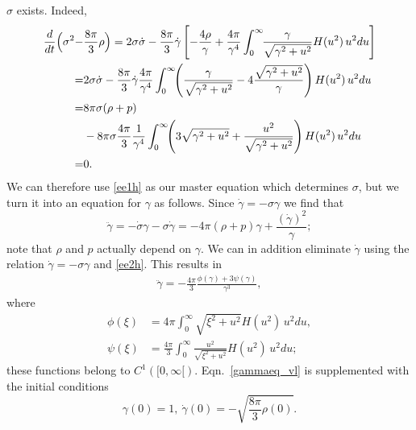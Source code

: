 \documentclass[11pt]{article}
\begin{document}
$\sigma$ exists. Indeed,
\begin{align*}
\frac{d}{dt}\Bigl(\sigma^2 -& \frac{8\pi}{3} \rho\Bigr)
  =
  2 \sigma \dot \sigma
  - \frac{8\pi}{3} \dot \gamma
  \left[-\frac{4\rho}{\gamma} + \frac{4\pi}{\gamma^4}
  \int_0^\infty\!\!\frac{\gamma}{\sqrt{\gamma^2 + u^2}} H(u^2)\, u^2 du
  \right]\\
  =&
  2 \sigma \dot \sigma
  - \frac{8\pi}{3} \dot \gamma
  \frac{4\pi}{\gamma^4}\int_0^\infty\!\!
  \left( \frac{\gamma}{\sqrt{\gamma^2 + u^2}}
  - 4\frac{\sqrt{\gamma^2 + u^2}}{\gamma}\right) H(u^2)\, u^2 du\\
  =&
  8 \pi \sigma (\rho + p)\\
  &
  {}- 8 \pi \sigma \frac{4\pi}{3}
  \frac{1}{\gamma^4}\int_0^\infty\!\!
  \left(3 \sqrt{\gamma^2 + u^2} +
  \frac{u^2}{\sqrt{\gamma^2 + u^2}}\right) H(u^2)\, u^2 du\\
  =&
  0.
\end{align*}
We can therefore use \eqref{ee1h} as our master equation which determines
$\sigma$, but we turn it into an equation for $\gamma$ as follows.
Since $\dot \gamma = -\sigma \gamma$ we find that
\[
\ddot \gamma = -\dot \sigma \gamma - \sigma \dot \gamma
= -4\pi (\rho + p) \gamma + \frac{(\dot \gamma)^2}{\gamma};
\]
note that $\rho$ and $p$ actually depend on $\gamma$. We can in
addition eliminate $\dot \gamma$ using the relation
$\dot \gamma = -\sigma \gamma$ and \eqref{ee2h}. This results in
\begin{align} \label{gammaeq_vl}
  \ddot \gamma = -\frac{4\pi}{3}
  \frac{\phi(\gamma) + 3 \psi(\gamma)}{\gamma^3},
\end{align}
where
\begin{align*}
\phi(\xi)
&=
4\pi \int_0^\infty \sqrt{\xi^2 + u^2} H(u^2)\, u^2 du,\\
\psi(\xi)
&=
\frac{4\pi}{3} \int_0^\infty \frac{u^2}{\sqrt{\xi^2 + u^2}} H(u^2)\, u^2 du;
\end{align*}
these functions belong to $C^1([0,\infty[)$.
Eqn.~\eqref{gammaeq_vl} is supplemented with the initial conditions
\[
\gamma(0)=1,\ \dot \gamma(0) = - \sqrt{\frac{8\pi}{3} \rho(0)}.
\]
%
%
\end{document}
